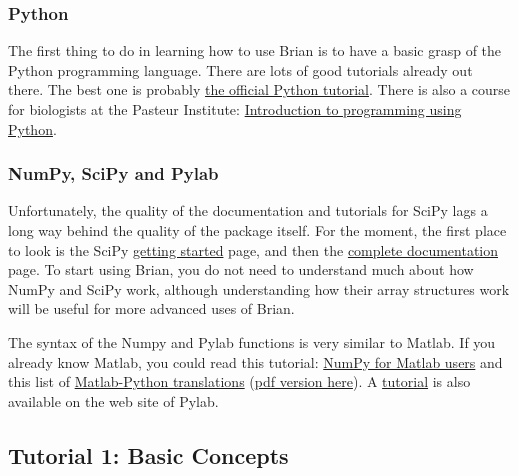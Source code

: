 \documentclass[letterpaper,10pt]{manual}
\begin{document}
\subsubsection{Python}

The first thing to do in learning how to use Brian
is to have a basic grasp of the Python programming language.
There are lots of good tutorials already out there. The best one is probably
\href{http://docs.python.org/tut/}{the official Python tutorial}.
There is also a course for biologists at the Pasteur Institute:
\href{http://www.pasteur.fr/formation/infobio/python/}{Introduction to programming using Python}.


\subsubsection{NumPy, SciPy and Pylab}

Unfortunately, the quality of the documentation and tutorials for SciPy lags a
long way behind the quality of the package itself. For the moment, the first
place to look is the SciPy \href{http://www.scipy.org/Getting\_Started}{getting started} page, and then the \href{http://www.scipy.org/Documentation}{complete documentation} page. To start using Brian, you do not need
to understand much about how NumPy and SciPy work, although understanding how their
array structures work will be useful for more advanced uses of Brian.

The syntax of the Numpy and Pylab functions is very similar to Matlab.
If you already know Matlab, you could read this tutorial:
\href{http://scipy.org/NumPy\_for\_Matlab\_Users}{NumPy for Matlab users}
and this list of \href{http://mathesaurus.sourceforge.net/}{Matlab-Python translations}
(\href{http://brian.di.ens.fr/matlab-python-xref.pdf}{pdf version here}).
A \href{http://matplotlib.sourceforge.net/tutorial.html}{tutorial} is also available on
the web site of Pylab.

\resetcurrentobjects


\hypertarget{tutorial1-basic-concepts}{}\subsection{Tutorial 1: Basic Concepts}
\end{document}
